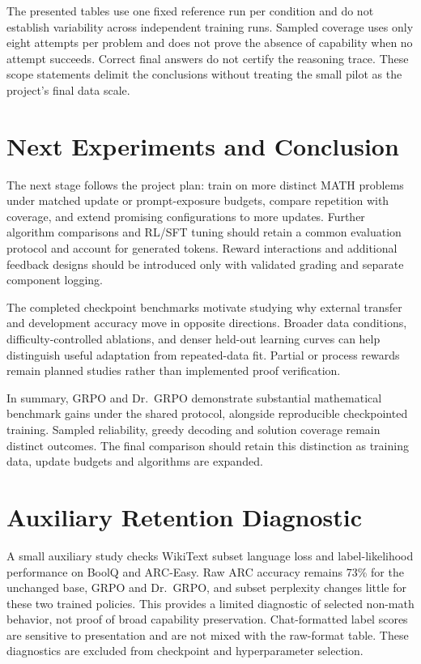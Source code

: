 \documentclass[conference]{IEEEtran}
\begin{document}
The presented tables use one fixed reference run per condition and do not establish variability across independent training runs. Sampled coverage uses only eight attempts per problem and does not prove the absence of capability when no attempt succeeds. Correct final answers do not certify the reasoning trace. These scope statements delimit the conclusions without treating the small pilot as the project's final data scale.

\section{Next Experiments and Conclusion}
The next stage follows the project plan: train on more distinct MATH problems under matched update or prompt-exposure budgets, compare repetition with coverage, and extend promising configurations to more updates. Further algorithm comparisons and RL/SFT tuning should retain a common evaluation protocol and account for generated tokens. Reward interactions and additional feedback designs should be introduced only with validated grading and separate component logging.

The completed checkpoint benchmarks motivate studying why external transfer and development accuracy move in opposite directions. Broader data conditions, difficulty-controlled ablations, and denser held-out learning curves can help distinguish useful adaptation from repeated-data fit. Partial or process rewards remain planned studies rather than implemented proof verification.

In summary, GRPO and Dr.~GRPO demonstrate substantial mathematical benchmark gains under the shared protocol, alongside reproducible checkpointed training. Sampled reliability, greedy decoding and solution coverage remain distinct outcomes. The final comparison should retain this distinction as training data, update budgets and algorithms are expanded.

\appendices
\section{Auxiliary Retention Diagnostic}

A small auxiliary study checks WikiText subset language loss and label-likelihood performance on BoolQ and ARC-Easy. Raw ARC accuracy remains 73\% for the unchanged base, GRPO and Dr.~GRPO, and subset perplexity changes little for these two trained policies. This provides a limited diagnostic of selected non-math behavior, not proof of broad capability preservation. Chat-formatted label scores are sensitive to presentation and are not mixed with the raw-format table. These diagnostics are excluded from checkpoint and hyperparameter selection.
\end{document}
